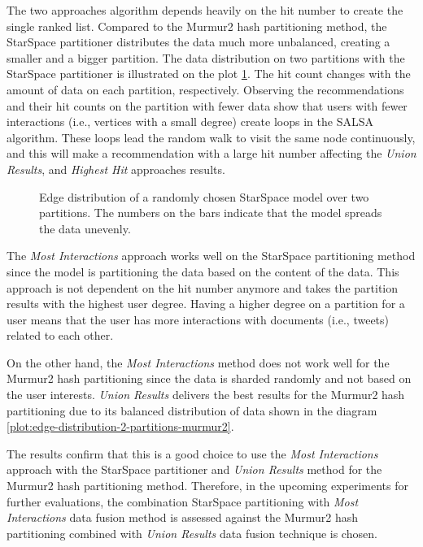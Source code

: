The two approaches algorithm depends heavily on the hit number to create the single ranked list. Compared to the Murmur2 hash partitioning method, the StarSpace partitioner distributes the data much more unbalanced, creating a smaller and a bigger partition. The data distribution on two partitions with the StarSpace partitioner is illustrated on the plot \ref{plot:star-space-edge-distribution-2-partitions}. The hit count changes with the amount of data on each partition, respectively. Observing the recommendations and their hit counts on the partition with fewer data show that users with fewer interactions (i.e., vertices with a small degree) create loops in the SALSA algorithm. These loops lead the random walk to visit the same node continuously, and this will make a recommendation with a large hit number affecting the \emph{Union Results}, and \emph{Highest Hit} approaches results.


\begin{figure}[!htb]
    \centering
    
    \caption{Edge distribution of a randomly chosen StarSpace model over two partitions. The numbers on the bars indicate that the model spreads the data unevenly.}
    \label{plot:star-space-edge-distribution-2-partitions}
\end{figure}


The \emph{Most Interactions} approach works well on the StarSpace partitioning method since the model is partitioning the data based on the content of the data. This approach is not dependent on the hit number anymore and takes the partition results with the highest user degree. Having a higher degree on a partition for a user means that the user has more interactions with documents (i.e., tweets) related to each other. 


On the other hand, the \emph{Most Interactions} method does not work well for the Murmur2 hash partitioning since the data is sharded randomly and not based on the user interests. \emph{Union Results} delivers the best results for the Murmur2 hash partitioning due to its balanced distribution of data shown in the diagram \ref{plot:edge-distribution-2-partitions-murmur2}. 


The results confirm that this is a good choice to use the \emph{Most Interactions} approach with the StarSpace partitioner and \emph{Union Results} method for the Murmur2 hash partitioning method. Therefore, in the upcoming experiments for further evaluations, the combination StarSpace partitioning with \emph{Most Interactions} data fusion method is assessed against the Murmur2 hash partitioning combined with \emph{Union Results} data fusion technique is chosen.


